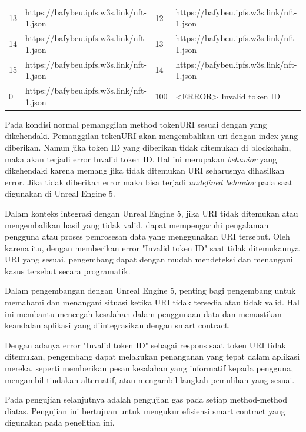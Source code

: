 \begin{longtable}{|p{0.5in}|p{2.2in}|p{0.5in}|p{2.2in}|}
  13               & https://bafybeu.ipfs.w3s.link/nft-1.json & 12                                 & https://bafybeu.ipfs.w3s.link/nft-1.json \\
  14               & https://bafybeu.ipfs.w3s.link/nft-1.json & 13                                 & https://bafybeu.ipfs.w3s.link/nft-1.json \\
  15               & https://bafybeu.ipfs.w3s.link/nft-1.json & 14                                 & https://bafybeu.ipfs.w3s.link/nft-1.json \\
  0                & https://bafybeu.ipfs.w3s.link/nft-1.json & 100                                & <ERROR> Invalid token ID                 \\
  \hline
\end{longtable}

Pada kondisi normal pemanggilan method tokenURI sesuai dengan yang dikehendaki. Pemanggilan tokenURI akan mengembalikan uri dengan index yang diberikan.
Namun jika token ID yang diberikan tidak ditemukan di blockchain, maka akan terjadi error Invalid token ID.
Hal ini merupakan \emph{behavior} yang dikehendaki karena memang jika tidak ditemukan URI seharusnya dihasilkan error.
Jika tidak   diberikan  error maka bisa terjadi \emph{undefined behavior} pada saat digunakan di Unreal Engine 5.

Dalam konteks integrasi dengan Unreal Engine 5, jika URI tidak ditemukan atau mengembalikan hasil yang tidak valid, dapat mempengaruhi pengalaman pengguna atau proses pemrosesan data yang menggunakan URI tersebut. Oleh karena itu, dengan memberikan error "Invalid token ID" saat tidak ditemukannya URI yang sesuai, pengembang dapat dengan mudah mendeteksi dan menangani kasus tersebut secara programatik.

Dalam pengembangan dengan Unreal Engine 5, penting bagi pengembang untuk memahami dan menangani situasi ketika URI tidak tersedia atau tidak valid. Hal ini membantu mencegah kesalahan dalam penggunaan data dan memastikan keandalan aplikasi yang diintegrasikan dengan smart contract.

Dengan adanya error "Invalid token ID" sebagai respons saat token URI tidak ditemukan, pengembang dapat melakukan penanganan yang tepat dalam aplikasi mereka, seperti memberikan pesan kesalahan yang informatif kepada pengguna, mengambil tindakan alternatif, atau mengambil langkah pemulihan yang sesuai.

Pada pengujian selanjutnya adalah pengujian gas pada setiap method-method diatas. Pengujian ini bertujuan untuk mengukur
efisiensi smart contract yang digunakan pada penelitian ini.

